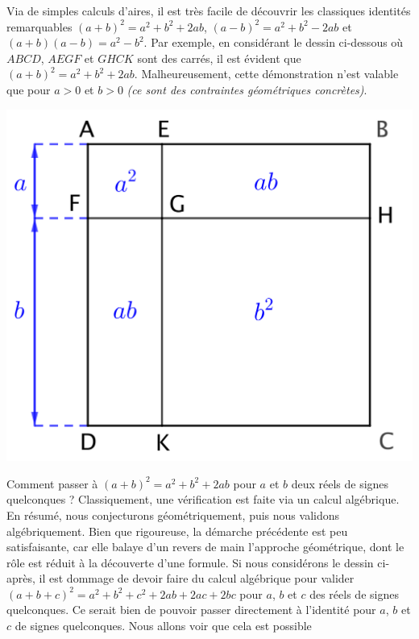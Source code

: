 Via de simples calculs d'aires, il est très facile de découvrir les classiques identités remarquables
$(a + b)^2 = a^2 + b^2 + 2ab$,
$(a - b)^2 = a^2 + b^2 - 2ab$
et
$(a + b)(a - b) = a^2 - b^2$.
%
Par exemple, en considérant le dessin ci-dessous où $ABCD$, $AEGF$ et $GHCK$ sont des carrés,
il est évident que $(a + b)^2 = a^2 + b^2 + 2 ab$.
Malheureusement, cette démonstration n'est valable que pour $a > 0$ et $b > 0$ \emph{(ce sont des contraintes géométriques concrètes)}.

\begin{center}
	\includegraphics[scale = .7]{(a+b)^2.png}
\end{center}


Comment passer à $(a + b)^2 = a^2 + b^2 + 2 ab$ pour $a$ et $b$ deux réels de signes quelconques ?
Classiquement, une vérification est faite via un calcul algébrique.
%
En résumé, nous conjecturons géométriquement, puis nous validons algébriquement.
%
Bien que rigoureuse, la démarche précédente est peu satisfaisante, car elle balaye d'un revers de main l'approche géométrique, dont le rôle est réduit à la découverte d'une formule.
Si nous considérons le dessin ci-après, il est dommage de devoir faire du calcul algébrique pour valider $(a + b + c)^2 = a^2 + b^2 + c^2 + 2 ab + 2 ac + 2 bc$ pour $a$, $b$ et $c$ des réels de signes quelconques.
Ce serait bien de pouvoir passer directement à l'identité pour $a$, $b$ et $c$ de signes quelconques.
Nous allons voir que cela est possible

